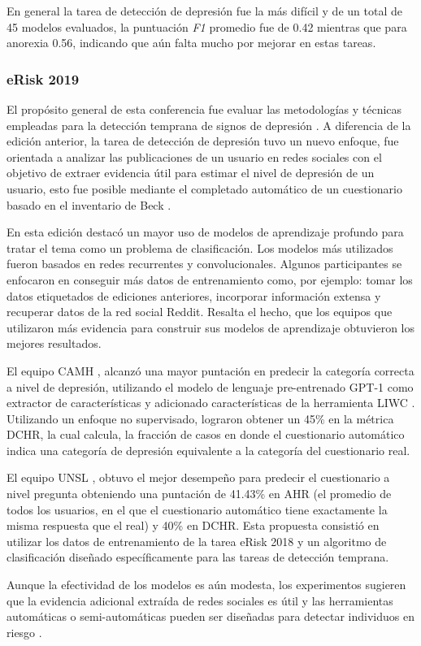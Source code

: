 En general la tarea de detección de depresión fue la más difícil y de un total de 45 modelos evaluados, la puntuación \textit{F1} promedio fue de 0.42 mientras que para anorexia 0.56, indicando que aún falta mucho por mejorar en estas tareas. 

\subsubsection{eRisk 2019}
El propósito general de esta conferencia fue evaluar las metodologías y técnicas empleadas para la detección temprana de signos de depresión \citep{Losada2019}. A diferencia de la edición anterior, la tarea de detección de depresión tuvo un nuevo enfoque, fue orientada a analizar las publicaciones de un usuario en redes sociales con el objetivo de extraer evidencia útil para estimar el nivel de depresión de un usuario, esto fue posible mediante el completado automático de un cuestionario basado en el inventario de Beck \cite{beck1961inventory}. 

En esta edición destacó un mayor uso de modelos de aprendizaje profundo para tratar el tema como un problema de clasificación. Los modelos más utilizados fueron basados en redes recurrentes y convolucionales. Algunos participantes se enfocaron en conseguir más datos de entrenamiento como, por ejemplo:  tomar los datos etiquetados de ediciones anteriores, incorporar información extensa y recuperar datos de la red social Reddit. Resalta el hecho, que los equipos que utilizaron más evidencia para construir sus modelos de aprendizaje obtuvieron los mejores resultados.

El equipo CAMH \citep{Abed-Esfahani2019}, alcanzó una mayor puntación en predecir la categoría correcta a nivel de depresión, utilizando el modelo de lenguaje pre-entrenado GPT-1 como extractor de características y adicionado características de la herramienta LIWC \citep{pennebaker2001linguistic}. Utilizando un enfoque no supervisado, lograron obtener un 45\% en la métrica DCHR, la cual calcula, la fracción de casos en donde el cuestionario automático indica una categoría de depresión equivalente a la categoría del cuestionario real.

El equipo UNSL \citep{Burdisso2019}, obtuvo el mejor desempeño para predecir el cuestionario a nivel pregunta obteniendo una puntación de 41.43\% en AHR (el promedio de todos los usuarios, en el que el cuestionario automático tiene exactamente la misma respuesta que el real) y 40\% en DCHR. Esta propuesta consistió en utilizar los datos de entrenamiento de la tarea eRisk 2018 y un algoritmo de clasificación diseñado específicamente para las tareas de detección temprana.

Aunque la efectividad de los modelos es aún modesta, los experimentos sugieren que la evidencia adicional extraída de redes sociales es útil y las herramientas automáticas o semi-automáticas pueden ser diseñadas para detectar individuos en riesgo \citep{losada2019overview}.